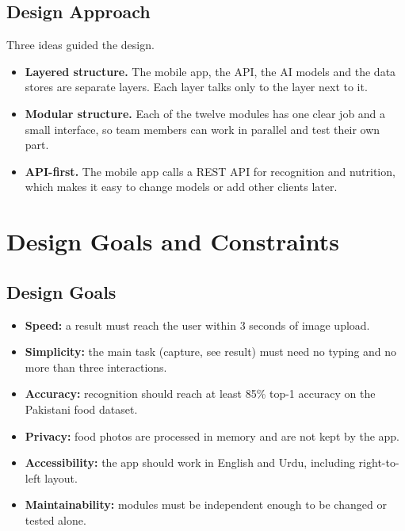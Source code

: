 \subsection{Design Approach}
Three ideas guided the design.
\begin{itemize}[noitemsep]
  \item \textbf{Layered structure.} The mobile app, the API, the AI models and the data stores
        are separate layers. Each layer talks only to the layer next to it.
  \item \textbf{Modular structure.} Each of the twelve modules has one clear job and a small
        interface, so team members can work in parallel and test their own part.
  \item \textbf{API-first.} The mobile app calls a REST API for recognition and nutrition,
        which makes it easy to change models or add other clients later.
\end{itemize}

\section{Design Goals and Constraints}
\subsection{Design Goals}
\begin{itemize}[noitemsep]
  \item \textbf{Speed:} a result must reach the user within 3 seconds of image upload.
  \item \textbf{Simplicity:} the main task (capture, see result) must need no typing and no more
        than three interactions.
  \item \textbf{Accuracy:} recognition should reach at least 85\% top-1 accuracy on the
        Pakistani food dataset.
  \item \textbf{Privacy:} food photos are processed in memory and are not kept by the app.
  \item \textbf{Accessibility:} the app should work in English and Urdu, including
        right-to-left layout.
  \item \textbf{Maintainability:} modules must be independent enough to be changed or tested alone.
\end{itemize}

